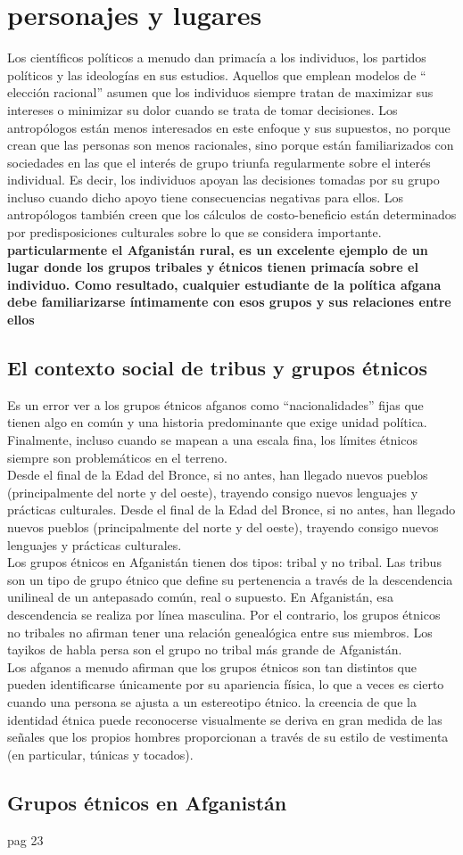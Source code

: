 \documentclass[10pt]{book}
\begin{document}
\chapter{personajes y lugares}
Los científicos políticos a menudo dan primacía a los individuos, los partidos políticos y las ideologías en sus estudios. Aquellos que emplean modelos de $“$elección racional$”$ asumen que los individuos siempre tratan de maximizar sus intereses o minimizar su dolor cuando se trata de tomar decisiones. Los antropólogos están menos interesados ​​en este enfoque y sus supuestos, no porque crean que las personas son menos racionales, sino porque están familiarizados con sociedades en las que el interés de grupo triunfa regularmente sobre el interés individual. Es decir, los individuos apoyan las decisiones tomadas por su grupo incluso cuando dicho apoyo tiene consecuencias negativas para ellos. Los antropólogos también creen que los cálculos de costo-beneficio están determinados por predisposiciones culturales sobre lo que se considera importante.\\
\textbf{particularmente el Afganistán rural, es un excelente ejemplo de un lugar donde los grupos tribales y étnicos tienen primacía sobre el individuo. Como resultado, cualquier estudiante de la política afgana debe familiarizarse íntimamente con esos grupos y sus relaciones entre ellos}
\section{El contexto social de tribus y grupos étnicos}
Es un error ver a los grupos étnicos afganos como “nacionalidades” fijas que tienen algo en común y una historia predominante que exige unidad política. Finalmente, incluso cuando se mapean a una escala fina, los límites étnicos siempre son problemáticos en el terreno. \\
Desde el final de la Edad del Bronce, si no antes, han llegado nuevos pueblos (principalmente del norte y del oeste), trayendo consigo nuevos lenguajes y prácticas culturales. Desde el final de la Edad del Bronce, si no antes, han llegado nuevos pueblos (principalmente del norte y del oeste), trayendo consigo nuevos lenguajes y prácticas culturales.\\
Los grupos étnicos en Afganistán tienen dos tipos: tribal y no tribal. Las tribus son un tipo de grupo étnico que define su pertenencia a través de la descendencia unilineal de un antepasado común, real o supuesto. En Afganistán, esa descendencia se realiza por línea masculina. Por el contrario, los grupos étnicos no tribales no afirman tener una relación genealógica entre sus miembros. Los tayikos de habla persa son el grupo no tribal más grande de Afganistán.\\
Los afganos a menudo afirman que los grupos étnicos son tan distintos que pueden identificarse únicamente por su apariencia física, lo que a veces es cierto cuando una persona se ajusta a un estereotipo étnico. la creencia de que la identidad étnica puede reconocerse visualmente se deriva en gran medida de las señales que los propios hombres proporcionan a través de su estilo de vestimenta (en particular, túnicas y tocados).
\section{Grupos étnicos en Afganistán}
pag 23
\end{document}
